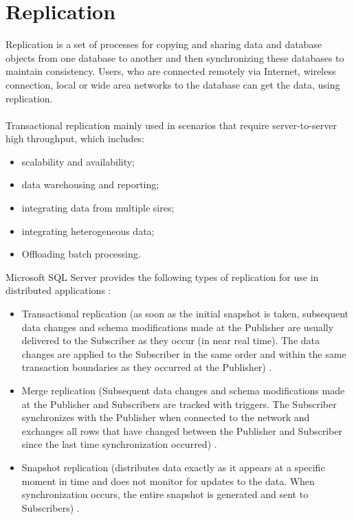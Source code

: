 \documentclass[english]{article}
\begin{document}
\section{Replication}
Replication is a set of processes for copying and sharing data and database objects from one database to another and then synchronizing these databases to maintain consistency. Users, who are connected remotely via Internet, wireless connection, local or wide area networks to the database can get the data, using replication.\cite{repInf}\\\\
Transactional replication mainly used in scenarios that require server-to-server high throughput, which includes:
\begin{itemize}
\item scalability and availability;
\item data warehousing and reporting;
\item integrating data from multiple sires;
\item integrating heterogeneous data;
\item Offloading batch processing.
\end{itemize}
Microsoft SQL Server provides the following types of replication for use in distributed applications \cite{typesRep}:
\begin{itemize}
\item Transactional replication (as soon as the initial snapshot is taken, subsequent data changes and schema modifications made at the Publisher are usually delivered to the Subscriber as they occur (in near real time). The data changes are applied to the Subscriber in the same order and within the same transaction boundaries as they occurred at the Publisher) \cite{transRep}.

\item Merge replication (Subsequent data changes and schema modifications made at the Publisher and Subscribers are tracked with triggers. The Subscriber synchronizes with the Publisher when connected to the network and exchanges all rows that have changed between the Publisher and Subscriber since the last time synchronization occurred) \cite{mergRep}.

\item Snapshot replication (distributes data exactly as it appears at a specific moment in time and does not monitor for updates to the data. When synchronization occurs, the entire snapshot is generated and sent to Subscribers) \cite{snapRep}.
\end{itemize}
\end{document}
